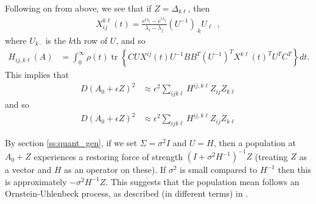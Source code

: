 \documentclass{article}
\newcommand{\tr}{\mathop{\mbox{tr}}} %
\newcommand{\1}{\mathbbm{1}}
\begin{document}
Following on from above, we see that if $Z=\Delta_{k \ell}$, then
\begin{equation}
  \begin{aligned}
      X_{ij}^{k\ell}(t) = 
      \frac{ e^{t \lambda_i} - e^{t \lambda_j} }{ \lambda_i - \lambda_j } 
      (U^{-1})_{\cdot k} U_{\ell \cdot},
  \end{aligned}
\end{equation}
where $U_{k \cdot}$ is the $k$th row of $U$,
and so
\begin{equation}
    \begin{aligned}
        H_{ij, k\ell}(A)
        &=
        \int_0^\infty
            \rho(t) \tr\left\{ C U X^{ij}(t) U^{-1} B B^T (U^{-1})^T X^{k\ell}(t)^T U^T C^T \right\}
        dt .
    \end{aligned}
\end{equation}
This implies that
\begin{equation}
    \begin{aligned}
        D(A_0+\epsilon Z)^2
        &\approx \epsilon^2\sum_{ijk\ell} H^{ij,k\ell} Z_{ij} Z_{k\ell} 
    \end{aligned}
\end{equation}
and so
\begin{equation}
    \begin{aligned}
        D(A_0+\epsilon Z)^2
        &\approx \epsilon^2\sum_{ijk\ell} H^{ij,k\ell} Z_{ij} Z_{k\ell} 
    \end{aligned}
\end{equation}

By section \ref{ss:quant_gen},
if we set $\Sigma=\sigma^2 I$ and $U=H$,
then a population at $A_0+Z$ experiences a restoring force of strength
$(I + \sigma^2 H^{-1})^{-1} Z$ (treating $Z$ as a vector and $H$ as an operator on these).
If $\sigma^2$ is small compared to $H^{-1}$
then this is approximately $-\sigma^2 H^{-1} Z$.
This suggests that the population mean follows an Ornstein-Uhlenbeck process,
as described (in different terms) in \citet{hansen1996translating}.
\end{document}
